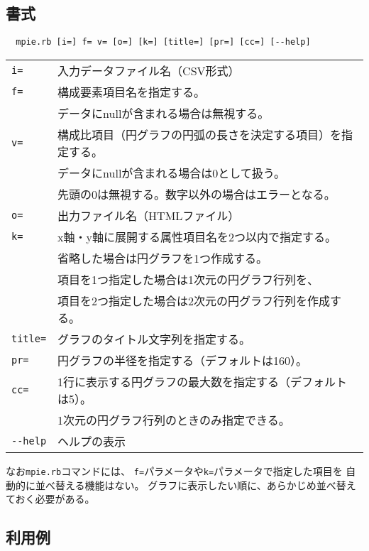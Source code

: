 \newpage
\subsection{書式}
\begin{verbatim}
  mpie.rb [i=] f= v= [o=] [k=] [title=] [pr=] [cc=] [--help]
\end{verbatim}

\begin{table}[htbp]
{\small
\begin{tabular}{ll}
\verb|i=|        & 入力データファイル名（CSV形式）\\
\verb|f=|        & 構成要素項目名を指定する。\\
                 & データにnullが含まれる場合は無視する。\\
\verb|v=|        & 構成比項目（円グラフの円弧の長さを決定する項目）を指定する。\\
                 & データにnullが含まれる場合は0として扱う。\\
                 & 先頭の0は無視する。数字以外の場合はエラーとなる。\\
\verb|o=|        & 出力ファイル名（HTMLファイル）\\
\verb|k=|        & x軸・y軸に展開する属性項目名を2つ以内で指定する。\\
                 & 省略した場合は円グラフを1つ作成する。\\
                 & 項目を1つ指定した場合は1次元の円グラフ行列を、\\
                 & 項目を2つ指定した場合は2次元の円グラフ行列を作成する。\\
\verb|title=|    & グラフのタイトル文字列を指定する。\\
\verb|pr=|       & 円グラフの半径を指定する（デフォルトは160）。\\
\verb|cc=|       & 1行に表示する円グラフの最大数を指定する（デフォルトは5）。\\
                 & 1次元の円グラフ行列のときのみ指定できる。\\
\verb|--help|    & ヘルプの表示\\
\end{tabular} 
}
\end{table} 

なお\verb|mpie.rb|コマンドには、
\verb|f=|パラメータや\verb|k=|パラメータで指定した項目を
自動的に並べ替える機能はない。
グラフに表示したい順に、あらかじめ並べ替えておく必要がある。

\subsection{利用例}


%

